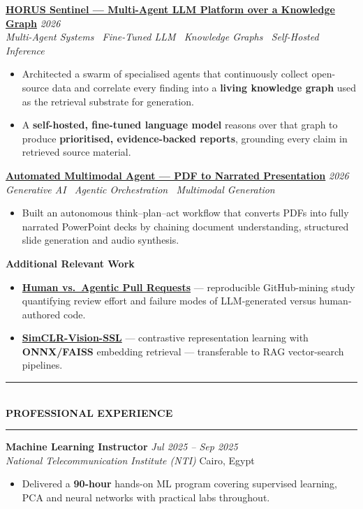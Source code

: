 \documentclass[10pt, a4paper]{article}
\newcommand{\cvsection}[1]{%
  \vspace{3pt}%
  {\color{navy}\rule{\linewidth}{1.1pt}}\\[0.5pt]%
  {\color{navy}\bfseries\fontsize{9.5}{11}\selectfont\uppercase{#1}}\\[-4pt]%
  {\color{teal}\rule{\linewidth}{0.6pt}}%
  \vspace{2pt}%
}
\newcommand{\cventry}[4]{%
  \vspace{2.5pt}%
  \textbf{\color{darkgray}#1} \hfill {\color{midgray}\textit{#3}}\\[-1.5pt]%
  {\color{teal}\textit{#2}} \hfill {\color{midgray}#4}%
}
\newcommand{\cvproject}[3]{%
  \vspace{2.5pt}%
  {\bfseries\color{navy}#1} \hfill {\color{midgray}\textit{#3}}\\[-1.5pt]%
  {\color{teal}\textit{#2}}%
}
\newcommand{\cvmini}[2]{\item {\bfseries\color{navy}#1} --- #2}
\newenvironment{cvitems}{%
  \begin{itemize}[leftmargin=11pt, itemsep=0.5pt, parsep=0pt, topsep=1pt,
                  label={\textcolor{teal}{$\bullet$}}]
}{%
  \end{itemize}%
}
\begin{document}
\cvproject{\href{https://github.com/MahmoudAlyosify/horus-sentinel}{HORUS Sentinel --- Multi-Agent LLM Platform over a Knowledge Graph}}
          {Multi-Agent Systems \textperiodcentered\ Fine-Tuned LLM \textperiodcentered\ Knowledge Graphs \textperiodcentered\ Self-Hosted Inference}
          {2026}
\begin{cvitems}
  \item Architected a swarm of specialised agents that continuously collect open-source data and correlate every finding into a \textbf{living knowledge graph} used as the retrieval substrate for generation.
  \item A \textbf{self-hosted, fine-tuned language model} reasons over that graph to produce \textbf{prioritised, evidence-backed reports}, grounding every claim in retrieved source material.
\end{cvitems}

\cvproject{\href{https://github.com/MahmoudAlyosify/Automated-Multimodal-Agent-PDF-to-Narrated-PowerPoint}{Automated Multimodal Agent --- PDF to Narrated Presentation}}
          {Generative AI \textperiodcentered\ Agentic Orchestration \textperiodcentered\ Multimodal Generation}
          {2026}
\begin{cvitems}
  \item Built an autonomous think--plan--act workflow that converts PDFs into fully narrated PowerPoint decks by chaining document understanding, structured slide generation and audio synthesis.
\end{cvitems}

\vspace{3pt}
{\bfseries\color{navy}Additional Relevant Work}
\begin{cvitems}
  \cvmini{\href{https://github.com/MahmoudAlyosify/Analyzing-Review-Effort-in-Human-vs.-Agentic-Pull-Requests}{Human vs.\ Agentic Pull Requests}}{reproducible GitHub-mining study quantifying review effort and failure modes of LLM-generated versus human-authored code.}
  \cvmini{\href{https://github.com/MahmoudAlyosify/SimCLR-Vision-SSL}{SimCLR-Vision-SSL}}{contrastive representation learning with \textbf{ONNX/FAISS} embedding retrieval --- transferable to RAG vector-search pipelines.}
\end{cvitems}

\cvsection{Professional Experience}

\cventry{Machine Learning Instructor}{National Telecommunication Institute (NTI)}
        {Jul 2025 -- Sep 2025}{Cairo, Egypt}
\begin{cvitems}
  \item Delivered a \textbf{90-hour} hands-on ML program covering supervised learning, PCA and neural networks with practical labs throughout.
\end{cvitems}
\end{document}

